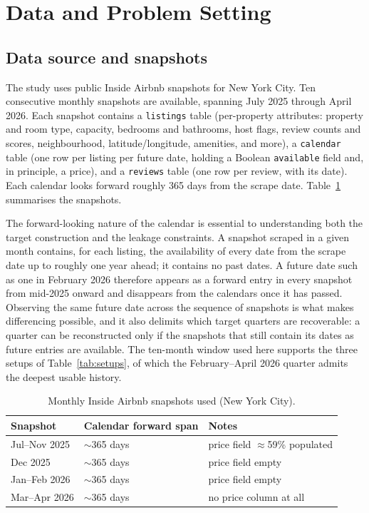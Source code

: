 \documentclass[journal]{IEEEtran}
\begin{document}
\section{Data and Problem Setting}
\label{sec:data}
\subsection{Data source and snapshots}
The study uses public Inside Airbnb snapshots \cite{insideairbnb} for New York
City. Ten consecutive monthly snapshots are available, spanning July 2025 through
April 2026. Each snapshot contains a \texttt{listings} table (per-property
attributes: property and room type, capacity, bedrooms and bathrooms, host flags,
review counts and scores, neighbourhood, latitude/longitude, amenities, and more),
a \texttt{calendar} table (one row per listing per future date, holding a Boolean
\texttt{available} field and, in principle, a price), and a \texttt{reviews} table
(one row per review, with its date). Each calendar looks forward roughly 365 days
from the scrape date. Table~\ref{tab:snapshots} summarises the snapshots.

The forward-looking nature of the calendar is essential to understanding both the
target construction and the leakage constraints. A snapshot scraped in a given
month contains, for each listing, the availability of every date from the scrape
date up to roughly one year ahead; it contains no past dates. A future date such as
one in February 2026 therefore appears as a forward entry in every snapshot from
mid-2025 onward and disappears from the calendars once it has passed. Observing the
same future date across the sequence of snapshots is what makes differencing
possible, and it also delimits which target quarters are recoverable: a quarter can
be reconstructed only if the snapshots that still contain its dates as future
entries are available. The ten-month window used here supports the three setups of
Table~\ref{tab:setups}, of which the February--April 2026 quarter admits the
deepest usable history.

\begin{table}[!t]
\caption{Monthly Inside Airbnb snapshots used (New York City).}
\label{tab:snapshots}
\centering
\small
\begin{tabular}{lll}
\toprule
Snapshot & Calendar forward span & Notes \\
\midrule
Jul--Nov 2025 & $\sim$365 days & price field $\approx$59\% populated \\
Dec 2025 & $\sim$365 days & price field empty \\
Jan--Feb 2026 & $\sim$365 days & price field empty \\
Mar--Apr 2026 & $\sim$365 days & no price column at all \\
\bottomrule
\end{tabular}
\end{table}
\end{document}

